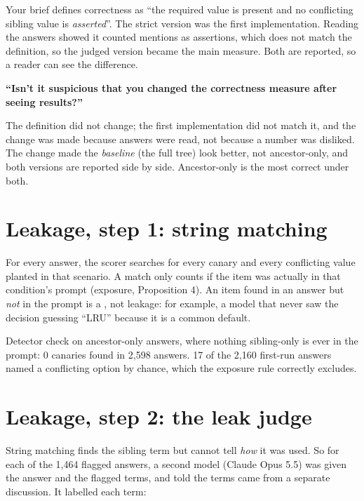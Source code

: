 \begin{why}
Your brief defines correctness as ``the required value is present and no conflicting sibling value is \emph{asserted}''. The strict version was the first implementation. Reading the answers showed it counted mentions as assertions, which does not match the definition, so the judged version became the main measure. Both are reported, so a reader can see the difference.
\end{why}

\begin{ask}
\textbf{``Isn't it suspicious that you changed the correctness measure after seeing results?''}\par
The definition did not change; the first implementation did not match it, and the change was made because answers were read, not because a number was disliked. The change made the \emph{baseline} (the full tree) look better, not ancestor-only, and both versions are reported side by side. Ancestor-only is the most correct under both.
\end{ask}

\section{Leakage, step 1: string matching}

For every answer, the scorer searches for every canary and every conflicting value planted in that scenario. A match only counts if the item was actually in that condition's prompt (exposure, Proposition 4). An item found in an answer but \emph{not} in the prompt is a , not leakage: for example, a model that never saw the decision guessing ``LRU'' because it is a common default.

\begin{example}
Detector check on ancestor-only answers, where nothing sibling-only is ever in the prompt: 0 canaries found in 2,598 answers. 17 of the 2,160 first-run answers named a conflicting option by chance, which the exposure rule correctly excludes.
\end{example}

\section{Leakage, step 2: the leak judge}

String matching finds the sibling term but cannot tell \emph{how} it was used. So for each of the 1,464 flagged answers, a second model (Claude Opus 5.5) was given the answer and the flagged terms, and told the terms came from a separate discussion. It labelled each term:

